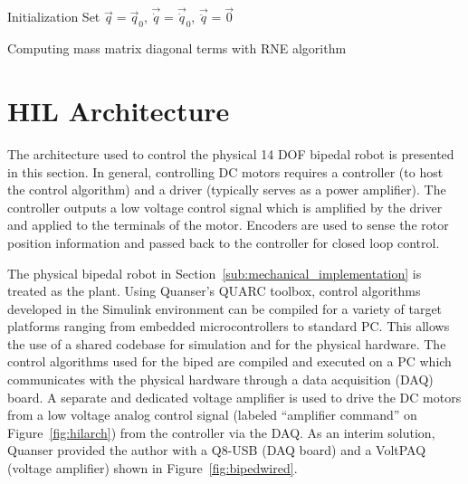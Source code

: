 \begin{algorithm}[H]
 \SetAlgoLined
 Initialization\;
 Set $\vec{q} = \vec{q}_0$, $\vec{\dot q} = \vec{\dot q}_0$, $\vec{\ddot q} = \vec{0}$\;
 \caption{Computing mass matrix diagonal terms with RNE algorithm}
 \label{alg:massdiag}
\end{algorithm}


\section{HIL Architecture} %
\label{sec:hil_architecture}
The architecture used to control the physical 14 DOF bipedal robot is presented in this section. In general, controlling DC motors requires a controller (to host the control algorithm) and a driver (typically serves as a power amplifier). The controller outputs a low voltage control signal which is amplified by the driver and applied to the terminals of the motor. Encoders are used to sense the rotor position information and passed back to the controller for closed loop  control. 

The physical bipedal robot in Section~\ref{sub:mechanical_implementation} is treated as the plant. Using Quanser's QUARC toolbox, control algorithms developed in the Simulink environment can be compiled for a variety of target platforms ranging from embedded microcontrollers to standard PC. This allows the use of a shared codebase for simulation and for the physical hardware. The control algorithms used for the biped are compiled and executed on a PC which communicates with the physical hardware through a data acquisition (DAQ) board. A separate and dedicated voltage amplifier is used to drive the DC motors from a low voltage analog control signal (labeled ``amplifier command'' on Figure~\ref{fig:hilarch}) from the controller via the DAQ. As an interim solution, Quanser provided the author with a Q8-USB (DAQ board) and a VoltPAQ (voltage amplifier) shown in Figure~\ref{fig:bipedwired}.

